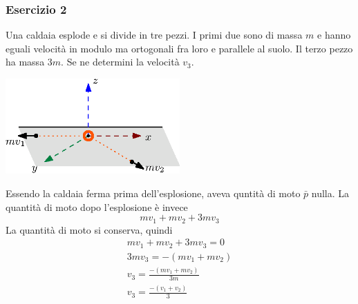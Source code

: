 \documentclass[10pt, letterpaper]{report}
\begin{document}
\subsubsection{Esercizio 2}
Una caldaia esplode e si divide in tre pezzi. I primi due sono di massa $m$ e hanno eguali velocità in modulo ma ortogonali fra loro e parallele al suolo. Il terzo pezzo ha massa $3m$. Se ne determini la velocità $v_3$.
\begin{center}
    \includegraphics[width=0.5\textwidth ]{images/caldaia.eps}
\end{center}
Essendo la caldaia ferma prima dell'esplosione, aveva quntità di moto $\bar p$ nulla. La quantità di moto dopo l'esplosione è invece 
$$ mv_1+mv_2+3mv_3$$
La quantità di moto si conserva, quindi 
\begin{eqnarray}
    mv_1+mv_2+3mv_3=0\\ 
    3mv_3=-(mv_1+mv_2)\\ 
    v_3=\frac{-(mv_1+mv_2)}{3m}\\
    v_3=\frac{-(v_1+v_2)}{3}
\end{eqnarray}\flowerLine 
\end{document}

